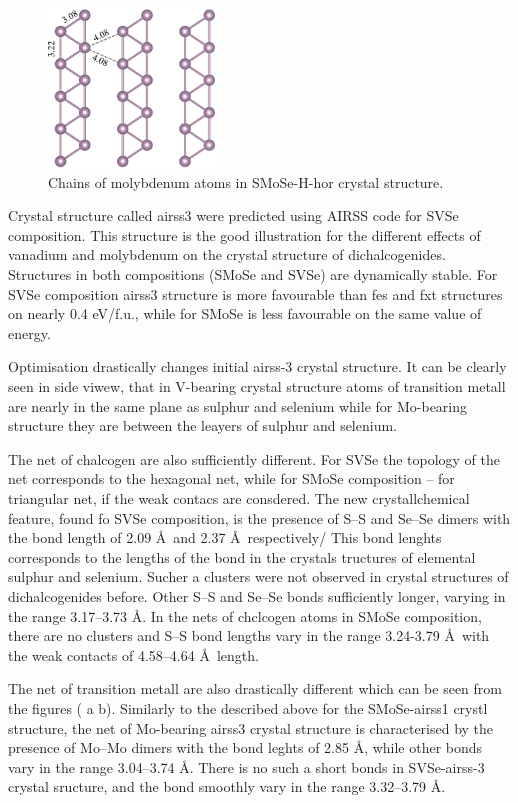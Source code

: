 \documentclass[a4paperm]{article}
\begin{document}
\begin{figure}[H]
	\includegraphics[width=0.4\textwidth]{H-hor_Mo.png}
	\caption{Chains of molybdenum atoms in SMoSe-H-hor crystal structure.}
\label{H-hor_Mo}
\end{figure} 




Crystal structure called airss3 were predicted using AIRSS code for SVSe composition.
This structure is the good illustration for the different effects of vanadium and molybdenum on the crystal structure of dichalcogenides.
Structures in both compositions (SMoSe and SVSe) are dynamically stable.
For SVSe composition airss3 structure is more favourable than fes and fxt structures on nearly 0.4 eV/f.u., while for SMoSe is less favourable on the same value of energy.

Optimisation drastically changes initial airss-3 crystal structure.
It can be clearly seen in side viwew, that in V-bearing crystal structure atoms of transition metall are nearly in the same plane as sulphur and selenium while for Mo-bearing structure they are between the leayers of sulphur and selenium.

The net of chalcogen are also sufficiently different.
For SVSe the topology of the net corresponds to the hexagonal net, while for SMoSe composition – for triangular net, if the weak contacs are consdered.
The new crystallchemical feature, found fo SVSe composition, is the presence of S--S and Se--Se dimers with the bond length of 2.09 \AA\ and 2.37 \AA\, respectively/
This bond lenghts corresponds to the lengths of the bond in the crystals tructures of elemental sulphur and selenium.
Sucher a clusters were not observed in crystal structures of dichalcogenides before.
Other S--S and Se--Se bonds sufficiently longer, varying in the range 3.17--3.73 \AA.
In the nets of chclcogen atoms in SMoSe composition, there are no clusters and S--S bond lengths vary in the range 3.24-3.79 \AA\ with the weak contacts of 4.58--4.64 \AA\ length.

The net of transition metall are also drastically different which can be seen from the figures ( a  b).
Similarly to the described above for the SMoSe-airss1 crystl structure, the net of Mo-bearing airss3 crystal structure is characterised by the presence of Mo--Mo dimers with the bond leghts of 2.85 \AA, while other bonds vary in the range 3.04--3.74 \AA.
There is no such a short bonds in SVSe-airss-3 crystal sructure, and the bond smoothly vary in the range 3.32--3.79 \AA.
\end{document}
